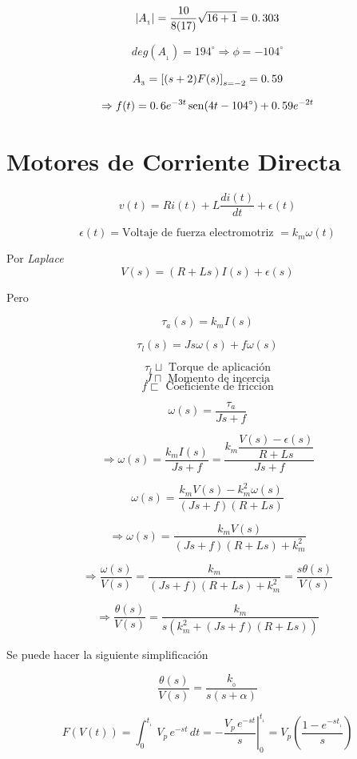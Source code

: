 $$|A_{_1}| = \dfrac{10}{8(17)} \sqrt{16 + 1} = 0\ldotp303$$

$$deg(A_{_1}) = 194^\circ \Rightarrow \phi = -104^\circ$$

$$A_{_3} = \left[ (s + 2)F(s) \right]_{s = -2} = 0\ldotp59$$

$$\Rightarrow f(t) = 0\ldotp6 e^{-3t} \mathop{\rm sen}\nolimits (4t - 104^\circ) + 0\ldotp59 e^{-2t}$$



\section{Motores de Corriente Directa}


$$v(t) = Ri(t) + L \dfrac{di(t)}{dt} + \epsilon(t)$$

$$\epsilon(t) = \mbox{Voltaje de fuerza electromotriz } = k_{m}\omega(t)$$ 

Por \textit{Laplace}
$$V(s) = (R + Ls)I(s) + \epsilon(s)$$

Pero

$$\tau_{a}(s) = k_{m}I(s)$$

$$\tau_{l}(s) = Js\omega(s) + f\omega (s)$$

$$\tau_{l} \sqcup \mbox{ Torque de aplicación}$$
$$J \sqcap \mbox{ Momento de incercia}$$
$$f \sqsubset \mbox{ Coeficiente de fricción}$$


$$\omega(s) = \dfrac{\tau_{a}}{Js + f}$$

$$\Rightarrow \omega(s) = \dfrac{k_{m}I(s)}{Js + f} = \dfrac{k_{m} \dfrac{V(s) - \epsilon (s)}{R + Ls}}{Js + f}$$

$$\omega(s) = \dfrac{k_{m} V(s) - k_{m}^{2}\omega(s)}{(Js + f)(R + Ls)}$$

$$\Rightarrow \omega(s) = \dfrac{k_{m}V(s)}{(Js + f)(R + Ls) + k_{m}^{2}}$$

$$\Rightarrow \dfrac{\omega(s)}{V(s)} = \dfrac{k_{m}}{(Js + f)(R + Ls) + k_{m}^{2}} = \dfrac{s\theta(s)}{V(s)}$$

$$\Rightarrow \dfrac{\theta(s)}{V(s)} = \dfrac{k_{m}}{s(k_{m}^{2} + (Js + f)(R + Ls))}$$

Se puede hacer la siguiente simplificación

$$\dfrac{\theta(s)}{V(s)} = \dfrac{k_{_{0}}}{s(s + \alpha)}$$


$$F(V(t)) = \displaystyle \int_{0}^{t_{_{1}}}\, V_{p}\,e^{-st}\, dt = \left. - \dfrac{V_{p}\,e^{-st}}{s} \right|_{0}^{t_{_{1}}} = V_{p} \left( \dfrac{1 - e^{-st_{_{1}}}}{s} \right) $$

